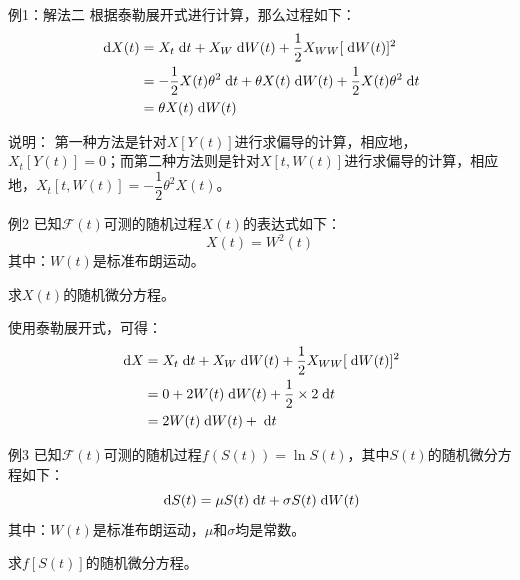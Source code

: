 \documentclass[t]{beamer}
\newcommand{\dif}{{\;\rm d}}
\begin{document}
\begin{frame}{例1：解法二}
    根据泰勒展开式进行计算，那么过程如下：
    \[\begin{split}
    \dif X(t)&= X_t \dif t+X_W \dif W(t)+\frac{1}{2}X_{WW}[\dif W(t)]^2\\
    &=-\frac{1}{2}X(t)\theta^2 \dif t+ \theta X(t)\dif W(t)+\frac{1}{2}X(t) \theta^2 \dif t\\
    &=\theta X(t)\dif W(t)
    \end{split} \]

    \begin{block}{说明：}
        第一种方法是针对$X[Y(t)]$进行求偏导的计算，相应地，$X_t[Y(t)]=0$；而第二种方法则是针对$X[t,W(t)]$进行求偏导的计算，相应地，$X_t[t,W(t)]=-\dfrac{1}{2}\theta^2 X(t)$。
    \end{block}
\end{frame}




\begin{frame}{例2}
已知$\mathcal{F}(t)$可测的随机过程$X(t)$的表达式如下：
\[X(t)=W^2(t) \]
其中：$W(t)$是标准布朗运动。

求$X(t)$的随机微分方程。

\begin{block}{}
    使用泰勒展开式，可得：
\[\begin{split}
\dif X&=X_t \dif t+X_W \dif W(t)+\frac{1}{2}X_{WW}[\dif W(t)]^2\\
&=0+2W(t)\dif W(t)+\frac{1}{2}\times 2\dif t\\
&=2W(t)\dif W(t)+\dif t
\end{split} \]
\end{block}
\end{frame}

\begin{frame}{例3}
已知$\mathcal{F}(t)$可测的随机过程$f(S(t))=\ln S(t)$，其中$S(t)$的随机微分方程如下：
\[\dif S(t)=\mu S(t)\dif t+\sigma S(t) \dif W(t) \]
其中：$W(t)$是标准布朗运动，$\mu$和$\sigma$均是常数。

求$f[S(t)]$的随机微分方程。
\end{frame}
\end{document}
